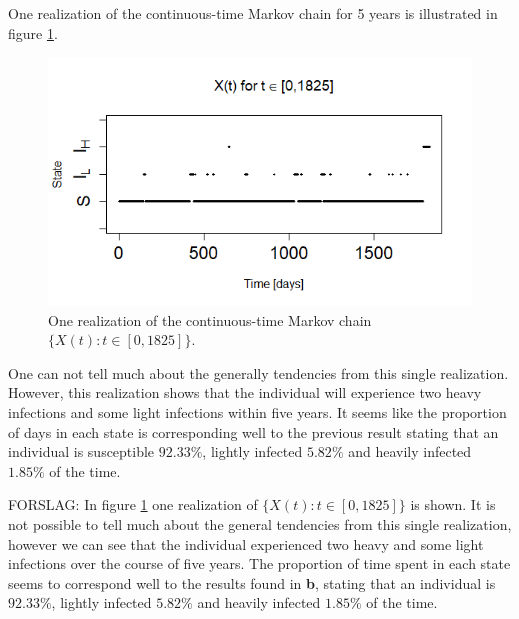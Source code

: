 One realization of the continuous-time Markov chain for 5 years is illustrated in figure \ref{1realiz5yr}.
\begin{figure}
    \centering
    \includegraphics[width=130mm]{1real5yr.png}
    \caption{One realization of the continuous-time Markov chain $\{X(t):t \in [0, 1825]\}$.}
    \label{1realiz5yr}
\end{figure}
One can not tell much about the generally tendencies from this single realization. However, this realization shows that the individual will experience two heavy infections and some light infections within five years. It seems like the proportion of days in each state is corresponding well to the previous result stating that an individual is susceptible $92.33\%$, lightly infected $5.82\%$ and heavily infected $1.85\%$ of the time. 


FORSLAG: In figure \ref{1realiz5yr} one realization of $\{X(t): t \in [0,1825]\}$ is shown. It is not possible to tell much about the general tendencies from this single realization, however we can see that the individual experienced two heavy and some light infections over the course of five years. The proportion of time spent in each state seems to correspond well to the results found in \textbf{b}, stating that an individual is  $92.33\%$, lightly infected $5.82\%$ and heavily infected $1.85\%$ of the time. 

